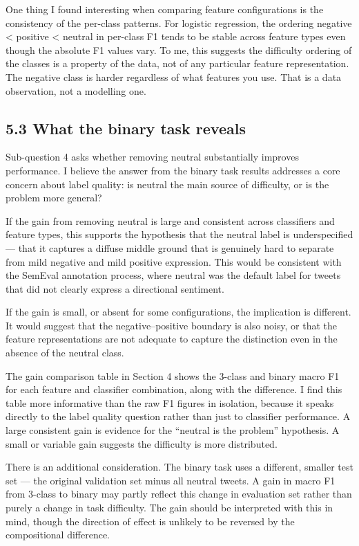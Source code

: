 \documentclass[12pt]{article}
\begin{document}
One thing I found interesting when comparing feature configurations is the consistency of the per-class patterns. For logistic regression, the ordering negative < positive < neutral in per-class F1 tends to be stable across feature types even though the absolute F1 values vary. To me, this suggests the difficulty ordering of the classes is a property of the data, not of any particular feature representation. The negative class is harder regardless of what features you use. That is a data observation, not a modelling one.

\subsection*{5.3 What the binary task reveals}

Sub-question 4 asks whether removing neutral substantially improves performance. I believe the answer from the binary task results addresses a core concern about label quality: is neutral the main source of difficulty, or is the problem more general?

If the gain from removing neutral is large and consistent across classifiers and feature types, this supports the hypothesis that the neutral label is underspecified --- that it captures a diffuse middle ground that is genuinely hard to separate from mild negative and mild positive expression. This would be consistent with the SemEval annotation process, where neutral was the default label for tweets that did not clearly express a directional sentiment.

If the gain is small, or absent for some configurations, the implication is different. It would suggest that the negative--positive boundary is also noisy, or that the feature representations are not adequate to capture the distinction even in the absence of the neutral class.

The gain comparison table in Section 4 shows the 3-class and binary macro F1 for each feature and classifier combination, along with the difference. I find this table more informative than the raw F1 figures in isolation, because it speaks directly to the label quality question rather than just to classifier performance. A large consistent gain is evidence for the ``neutral is the problem'' hypothesis. A small or variable gain suggests the difficulty is more distributed.

There is an additional consideration. The binary task uses a different, smaller test set --- the original validation set minus all neutral tweets. A gain in macro F1 from 3-class to binary may partly reflect this change in evaluation set rather than purely a change in task difficulty. The gain should be interpreted with this in mind, though the direction of effect is unlikely to be reversed by the compositional difference.
\end{document}
